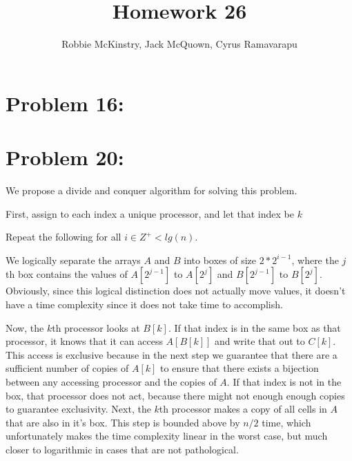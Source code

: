 \documentclass[12pt]{article}
\begin{document}
\title{Homework 26}
\author{Robbie McKinstry, Jack McQuown, Cyrus Ramavarapu}
\renewcommand{\today}{2 November 2016}
\renewcommand{\baselinestretch}{1.5}
\maketitle

\section*{Problem 16: }
\section*{Problem 20: }

We propose a divide and conquer algorithm for solving this problem.

First, assign to each index a unique processor, and let that index be $k$

Repeat the following for all $i \in Z^{+} < lg(n)$.

We logically separate the arrays $A$ and $B$ into boxes of size $2*2^{i-1}$, where the $j$th box contains the values of $A[2^{j-1}]$ to $A[2^{j}]$ and $B[2^{j-1}]$ to $B[2^{j}]$. Obviously, since this logical distinction does not actually move values, it doesn't have a time complexity since it does not take time to accomplish.

Now, the $k$th processor looks at $B[k]$. If that index is in the same box as that processor, it knows that it can access  $A[B[k]]$ and write that out to $C[k]$. This access is exclusive because in the next step we guarantee that there are a sufficient number of copies of $A[k]$ to ensure that there exists a bijection between any accessing processor and the copies of $A$. If that index is not in the box, that processor does not act, because there might not enough enough copies to guarantee exclusivity. Next, the $k$th processor makes a copy of all cells in $A$ that are also in it's box. This step is bounded above by $n/2$ time, which unfortunately makes the time complexity linear in the worst case, but much closer to logarithmic in cases that are not pathological.
\end{document}
